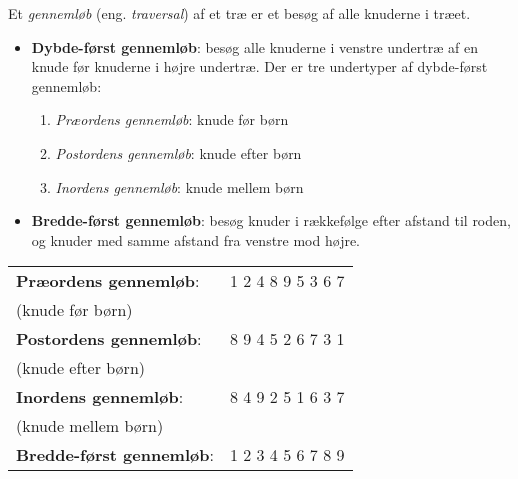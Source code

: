 \documentclass[rgb]{beamer}
\begin{document}
\begin{frame}[fragile]
\begin{footnotesize}

  \vspace{1ex}

  Et \emph{gennemløb} (eng. \emph{traversal}) af et træ er et besøg af alle
  knuderne i træet.

  \vspace{1ex}


\begin{itemize}
\item \textbf{Dybde-først gennemløb}: besøg alle knuderne i venstre
  undertræ af en knude før knuderne i højre undertræ.  Der
  er tre undertyper af dybde-først gennemløb:

  \begin{enumerate}
  \item \emph{Præordens gennemløb}: knude før børn
  \item \emph{Postordens gennemløb}: knude efter børn
  \item \emph{Inordens gennemløb}: knude mellem børn
  \end{enumerate}
\item \textbf{Bredde-først gennemløb}: besøg knuder i rækkefølge efter
  afstand til roden, og knuder med samme afstand fra venstre mod højre.
\end{itemize}

\end{footnotesize}
\end{frame}

\begin{frame}[fragile]
\begin{footnotesize}


  \vspace{2ex}

  \begin{minipage}{0.55\textwidth}
\begin{tabular}{ll}
  \textbf{Præordens gennemløb}: & 1 2 4 8 9 5 3 6 7\\
  (knude før børn) \\[2ex]
  \textbf{Postordens gennemløb}: & 8 9 4 5 2 6 7 3 1 \\
  (knude efter børn) \\[2ex]
  \textbf{Inordens gennemløb}: & 8 4 9 2 5 1 6 3 7 \\
  (knude mellem børn) \\[2ex]
  \textbf{Bredde-først gennemløb}: & 1 2 3 4 5 6 7 8 9
\end{tabular}
  \end{minipage}
  \begin{minipage}{0.4\textwidth}
    \end{minipage}

\end{footnotesize}
\end{frame}
\end{document}
